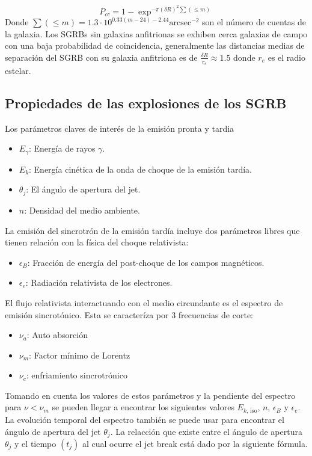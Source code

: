 \documentclass[12pt,a4paper]{book}
\begin{document}
\begin{equation}
P_{cc} = 1 - \exp ^{- \pi (\delta R)^{2} \sum(\leq m)}
\end{equation}
Donde $\sum(\leq m) = 1.3\cdot 10^{0.33(m-24)-2.44} \mathrm{arcsec} ^{-2}$ son el número de cuentas de la galaxia. Los SGRBs sin galaxias anfitrionas se exhiben cerca galaxias de campo con una baja probabilidad de coincidencia, generalmente las distancias medias de separación del SGRB con su galaxia anfitriona es de $ \frac{\delta R}{r_e} \approx 1.5$ donde $r_e$ es el radio estelar. 

\subsection{Propiedades de las explosiones de los SGRB}

Los parámetros claves de interés de la emisión pronta y tardia \cite{Berger:2013jza}
\begin{itemize}
\item $E_{\gamma}$: Energía de rayos $\gamma$.
\item $E_k$: Energía cinética de la onda de choque de la emisión tardía.
\item $\theta_j$: El ángulo de apertura del jet.
\item $n$: Densidad del medio ambiente.
\end{itemize}

La emisión del sincrotrón de la emisión tardía incluye dos parámetros libres que tienen relación con la física del choque relativista:
\begin{itemize}
\item $\epsilon_{B}$: Fracción de energía del post-choque de los campos magnéticos.
\item $\epsilon_e$: Radiación relativista de los electrones. 
\end{itemize}



El flujo relativista interactuando con el medio circundante es el espectro de emisión sincrotónico. Esta se caracteríza por 3 frecuencias de corte:
\begin{itemize}
\item $\nu_a$: Auto absorción
\item $\nu_m$: Factor mínimo de Lorentz
\item $\nu_c$: enfriamiento sincrotrónico
\end{itemize}

Tomando en cuenta los valores de estos parámetros y la pendiente del espectro para $\nu < \nu_m$ se pueden llegar a encontrar los siguientes valores $E_{k, \, \mathrm{iso}}$, $n$, $\epsilon_{B}$ y $\epsilon_e$. La evolución temporal del espectro también se puede usar para encontrar el ángulo de apertura del jet $\theta_j$. La relacción que existe entre el ángulo de apertura $\theta_j$ y el tiempo $(t_j)$ al cual ocurre el jet break  está dado por la siguiente fórmula.
\end{document}
